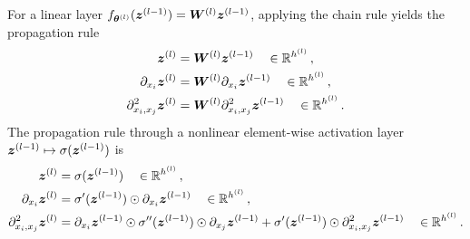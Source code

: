 For a linear layer $f_{{\bm{\theta}}^{(l)}}({\bm{z}}^{(l-1)}) = {\bm{W}}^{(l)} {\bm{z}}^{(l-1)}$, applying the chain rule yields the propagation rule
\begin{subequations}\label{eq:forward_pass}
  \begin{align}
    {\bm{z}}^{(l)}
    &=
      {\bm{W}}^{(l)} {\bm{z}}^{(l-1)} \quad \in {\mathbb{R}}^{h^{(l)}}\,,
    \\
    \partial_{x_i} {\bm{z}}^{(l)}
    &=
      {\bm{W}}^{(l)} \partial_{x_i} {\bm{z}}^{(l-1)}  \quad \in {\mathbb{R}}^{h^{(l)}}\,,
    \\
    \label{subeq:secondOrderForward-LinearLayer}
    \partial^2_{x_i,x_j} {\bm{z}}^{(l)}
    &=
      {\bm{W}}^{(l)} \partial^2_{x_i,x_j} {\bm{z}}^{(l-1)}  \quad \in {\mathbb{R}}^{h^{(l)}}\,.
  \end{align}
\end{subequations}
The propagation rule through a nonlinear element-wise activation layer ${\bm{z}}^{(l-1)}\mapsto \sigma({\bm{z}}^{(l-1)})$ is
\begin{subequations}\label{eq:taylor-forward-activation}
  \begin{align}
    {\bm{z}}^{(l)}
    &=
      \sigma({\bm{z}}^{(l-1)})\quad \in {\mathbb{R}}^{h^{(l)}}\,,
    \\
    \partial_{x_i} {\bm{z}}^{(l)}
    &=
      \sigma'({\bm{z}}^{(l-1)}) \odot \partial_{x_i} {\bm{z}}^{(l-1)}\quad \in {\mathbb{R}}^{h^{(l)}}\,,
    \\
    \label{subeq:secondOrderForward-nonlinearLayer}
    \partial^2_{x_i,x_j} {\bm{z}}^{(l)}
    &=
      \partial_{x_i} {\bm{z}}^{(l-1)} \odot \sigma''({\bm{z}}^{(l-1)}) \odot \partial_{x_j} {\bm{z}}^{(l-1)}
      +
      \sigma'({\bm{z}}^{(l-1)}) \odot \partial^2_{x_i,x_j} {\bm{z}}^{(l-1)}\quad \in {\mathbb{R}}^{h^{(l)}}\,.
  \end{align}
\end{subequations}

